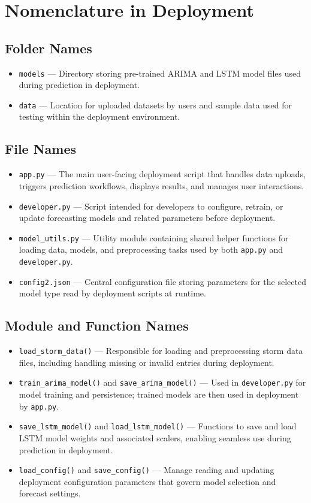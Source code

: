 \section{Nomenclature in Deployment}

\subsection{Folder Names}
\begin{itemize}
	\item \texttt{models} — Directory storing pre-trained ARIMA and LSTM model files used during prediction in deployment.
	\item \texttt{data} — Location for uploaded datasets by users and sample data used for testing within the deployment environment.
\end{itemize}

\subsection{File Names}
\begin{itemize}
	\item \texttt{app.py} — The main user-facing deployment script that handles data uploads, triggers prediction workflows, displays results, and manages user interactions.
	\item \texttt{developer.py} — Script intended for developers to configure, retrain, or update forecasting models and related parameters before deployment.
	\item \texttt{model\_utils.py} — Utility module containing shared helper functions for loading data, models, and preprocessing tasks used by both \texttt{app.py} and \texttt{developer.py}.
	\item \texttt{config2.json} — Central configuration file storing parameters for the  selected model type  read by deployment scripts at runtime.
\end{itemize}

\subsection{Module and Function Names}
\begin{itemize}
	\item \texttt{load\_storm\_data()} — Responsible for loading and preprocessing storm data files, including handling missing or invalid entries during deployment.
	\item \texttt{train\_arima\_model()} and \texttt{save\_arima\_model()} — Used in \texttt{developer.py} for model training and persistence; trained models are then used in deployment by \texttt{app.py}.
	\item \texttt{save\_lstm\_model()} and \texttt{load\_lstm\_model()} — Functions to save and load LSTM model weights and associated scalers, enabling seamless use during prediction in deployment.
	\item \texttt{load\_config()} and \texttt{save\_config()} — Manage reading and updating deployment configuration parameters that govern model selection and forecast settings.
\end{itemize}

